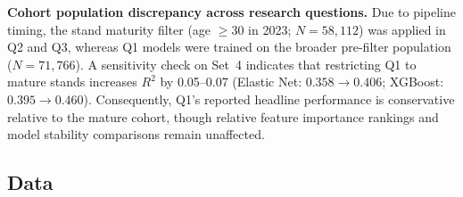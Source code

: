 \textbf{Cohort population discrepancy across research questions.}
Due to pipeline timing, the stand maturity filter (age $\ge 30$ in 2023; $N = 58{,}112$) was applied in Q2 and Q3, whereas Q1 models were trained on the broader pre-filter population ($N = 71{,}766$). A sensitivity check on Set~4 indicates that restricting Q1 to mature stands increases $R^2$ by 0.05--0.07 (Elastic Net: $0.358 \to 0.406$; XGBoost: $0.395 \to 0.460$). Consequently, Q1's reported headline performance is conservative relative to the mature cohort, though relative feature importance rankings and model stability comparisons remain unaffected.







\subsection*{Data}

